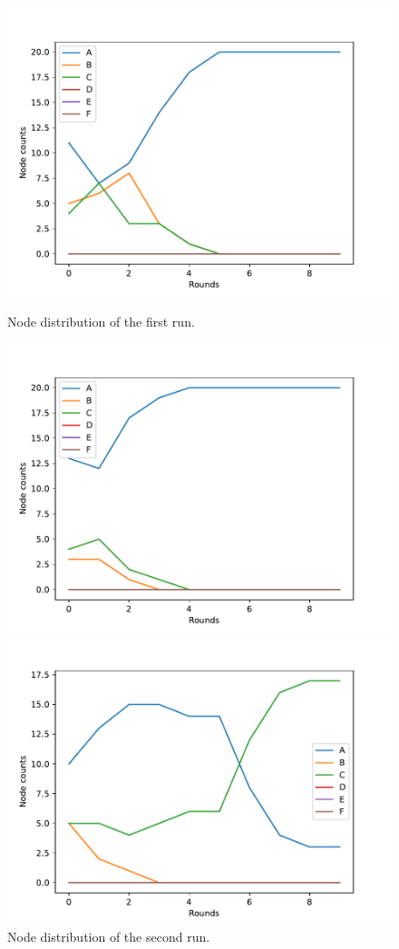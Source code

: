 \documentclass[11pt]{article}
\begin{document}
\begin{figure}[ht] 
  \label{ fig7} 
  \begin{minipage}[b]{0.5\linewidth}
    \centering
    \includegraphics[width=0.9\linewidth]{results/01/run-1/distribution} 
    \caption{Node distribution of the first run.} 
  \end{minipage}%
  \begin{minipage}[b]{0.5\linewidth}
    \centering
    \includegraphics[width=0.9\linewidth]{results/01/run-2/distribution} 
    \caption{Node distribution of the second run.}
  \end{minipage} 
  \begin{minipage}[b]{0.5\linewidth}
    \centering
    \includegraphics[width=0.9\linewidth]{results/01/run-3/distribution} 

\end{minipage}
\end{figure}
\end{document}
